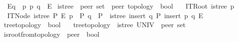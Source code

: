 \begin{isabellebody}
\ \ {\isachardoublequoteopen}E{\isasymlangle}{\isasymrightarrow}q{\isasymrangle}\ {\isasymequiv}\ {\isacharbraceleft}{\kern0pt}p{\isachardot}{\kern0pt}\ {\isacharparenleft}{\kern0pt}p{\isacharcomma}{\kern0pt}\ q{\isacharparenright}{\kern0pt}\ {\isasymin}\ E{\isacharbraceright}{\kern0pt}{\isachardoublequoteclose}%
\isadelimdocument
%
\endisadelimdocument
%
\isatagdocument
%
\isamarkuptrue%
%
\endisatagdocument
{\isafolddocument}%
%
\isadelimdocument
%
\endisadelimdocument
{}\isamarkupfalse%
\ is{\isacharunderscore}{\kern0pt}tree\ {\isacharcolon}{\kern0pt}{\isacharcolon}{\kern0pt}\ {\isachardoublequoteopen}{\isacharprime}{\kern0pt}peer\ set\ {\isasymRightarrow}\ {\isacharprime}{\kern0pt}peer\ topology\ {\isasymRightarrow}\ bool{\isachardoublequoteclose}\ \isanewline
\ \ ITRoot{\isacharcolon}{\kern0pt}\ {\isachardoublequoteopen}is{\isacharunderscore}{\kern0pt}tree\ {\isacharbraceleft}{\kern0pt}p{\isacharbraceright}{\kern0pt}\ {\isacharbraceleft}{\kern0pt}{\isacharbraceright}{\kern0pt}{\isachardoublequoteclose}\ {\isacharbar}{\kern0pt}\isanewline
\ \ ITNode{\isacharcolon}{\kern0pt}\ {\isachardoublequoteopen}{\isasymlbrakk}is{\isacharunderscore}{\kern0pt}tree\ P\ E{\isacharsemicolon}{\kern0pt}\ p\ {\isasymin}\ P{\isacharsemicolon}{\kern0pt}\ q\ {\isasymnotin}\ P{\isasymrbrakk}\ {\isasymLongrightarrow}\ is{\isacharunderscore}{\kern0pt}tree\ {\isacharparenleft}{\kern0pt}insert\ q\ P{\isacharparenright}{\kern0pt}\ {\isacharparenleft}{\kern0pt}insert\ {\isacharparenleft}{\kern0pt}p{\isacharcomma}{\kern0pt}\ q{\isacharparenright}{\kern0pt}\ E{\isacharparenright}{\kern0pt}{\isachardoublequoteclose}\isanewline
\isanewline
{}\isamarkupfalse%
\ tree{\isacharunderscore}{\kern0pt}topology\ {\isacharcolon}{\kern0pt}{\isacharcolon}{\kern0pt}\ {\isachardoublequoteopen}bool{\isachardoublequoteclose}\ \isanewline
\ \ {\isachardoublequoteopen}tree{\isacharunderscore}{\kern0pt}topology\ {\isasymequiv}\ is{\isacharunderscore}{\kern0pt}tree\ {\isacharparenleft}{\kern0pt}UNIV\ {\isacharcolon}{\kern0pt}{\isacharcolon}{\kern0pt}\ {\isacharprime}{\kern0pt}peer\ set{\isacharparenright}{\kern0pt}\ {\isacharparenleft}{\kern0pt}{\isasymG}{\isacharparenright}{\kern0pt}{\isachardoublequoteclose}\isanewline
\isanewline
{}\isamarkupfalse%
\ is{\isacharunderscore}{\kern0pt}root{\isacharunderscore}{\kern0pt}from{\isacharunderscore}{\kern0pt}topology\ {\isacharcolon}{\kern0pt}{\isacharcolon}{\kern0pt}\ {\isachardoublequoteopen}{\isacharprime}{\kern0pt}peer\ {\isasymRightarrow}\ bool{\isachardoublequoteclose}\ \isanewline

\end{isabellebody}
